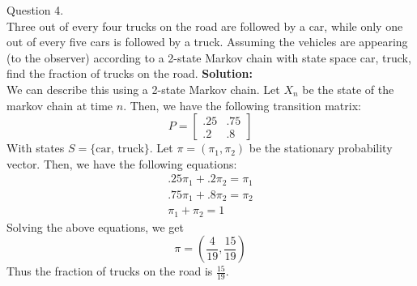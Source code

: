\documentclass[answers,12pt,addpoints]{exam}
\begin{document}
\begin{questions}
\question Question 4.\\
Three out of every four trucks on the road are followed by a car, while only one out of every five cars is followed by a truck. Assuming the vehicles are appearing (to the observer) according to a 2-state Markov chain with state space {car, truck}, find the fraction of trucks on the road.
\textbf{Solution:}\\ 
We can describe this using a 2-state Markov chain. Let $X_n$ be the state of the markov chain at time $n$. Then, we have the following transition matrix:
$$P = \begin{bmatrix}
    .25 & .75\\
    .2 & .8
\end{bmatrix}$$
With states $S = \{ \text{car, truck} \}$. Let $\pi = (\pi_1, \pi_2)$ be the stationary probability vector. Then, we have the following equations:
\begin{align*}
    .25\pi_1 + .2\pi_2 = \pi_1\\
    .75\pi_1 + .8\pi_2 = \pi_2\\
    \pi_1 + \pi_2 = 1
\end{align*}
Solving the above equations, we get
$$\pi = (\frac{4}{19}, \frac{15}{19})$$
Thus the fraction of trucks on the road is $\frac{15}{19}$.


\end{questions}
\end{document}
